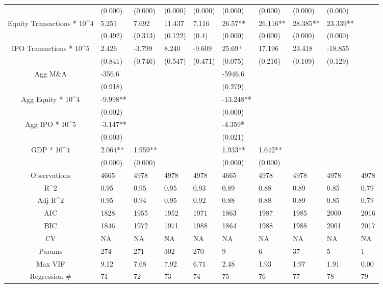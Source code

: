 \documentclass{article}
\begin{document}
\begin{table}[H]
\begin{tabular}{|clllllllll|}
   & (0.000) & (0.000) & (0.000) & (0.000) & (0.000) & (0.000) & (0.000) & (0.000) &  \\ 
  Equity Transactions * 10^4 & 5.251 & 7.692 & 11.437 & 7.116 & 26.57** & 26.116** & 28.385** & 23.339** &  \\ 
   & (0.492) & (0.313) & (0.122) & (0.4) & (0.000) & (0.000) & (0.000) & (0.000) &  \\ 
  IPO Transactions * 10^5 & 2.426 & -3.799 & 8.240 & -9.609 & 25.69$^{+}$ & 17.196 & 23.418 & -18.855 &  \\ 
   & (0.841) & (0.746) & (0.547) & (0.471) & (0.075) & (0.216) & (0.109) & (0.129) &  \\ 
  Agg M\&A & -356.6 &  &  &  & -5946.6 &  &  &  &  \\ 
   & (0.918) &  &  &  & (0.279) &  &  &  &  \\ 
  Agg Equity * 10^4 & -9.998** &  &  &  & -13.248** &  &  &  &  \\ 
   & (0.002) &  &  &  & (0.000) &  &  &  &  \\ 
  Agg IPO * 10^5 & -3.147** &  &  &  & -4.359* &  &  &  &  \\ 
   & (0.003) &  &  &  & (0.021) &  &  &  &  \\ 
  GDP * 10^4 & 2.064** & 1.959** &  &  & 1.933** & 1.642** &  &  &  \\ 
   & (0.000) & (0.000) &  &  & (0.000) & (0.000) &  &  &  \\ 
  \hline 
 Observations & 4665 & 4978 & 4978 & 4978 & 4665 & 4978 & 4978 & 4978 & 4978 \\ 
  R^2 & 0.95 & 0.95 & 0.95 & 0.93 & 0.89 & 0.88 & 0.89 & 0.85 & 0.79 \\ 
  Adj R^2 & 0.95 & 0.94 & 0.95 & 0.92 & 0.88 & 0.88 & 0.89 & 0.85 & 0.79 \\ 
  AIC & 1828 & 1955 & 1952 & 1971 & 1863 & 1987 & 1985 & 2000 & 2016 \\ 
  BIC & 1846 & 1972 & 1971 & 1988 & 1864 & 1988 & 1988 & 2001 & 2017 \\ 
  CV & NA & NA & NA & NA & NA & NA & NA & NA & NA \\ 
  Params & 274 & 271 & 302 & 270 & 9 & 6 & 37 & 5 & 1 \\ 
  Max VIF & 9.12 & 7.68 & 7.92 & 6.71 & 2.48 & 1.93 & 1.97 & 1.91 & 0.00 \\ 
  Regression \# & 71 & 72 & 73 & 74 & 75 & 76 & 77 & 78 & 79 \\ 
   \hline
\end{tabular}
 
\end{table}
\end{document}
